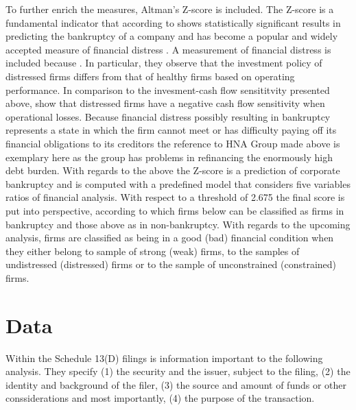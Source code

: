\documentclass[12pt]{article}
\begin{document}
To further enrich the measures, Altman's Z-score is included. The Z-score is a fundamental indicator that according to \citet[p.5]{Mohr2012} shows statistically significant results in predicting the bankruptcy of a company and has become a popular and widely accepted measure of financial distress \citep[p.2903]{Campbell2008}. A measurement of financial distress is included because . In particular, they observe that the investment policy of distressed firms differs from that of healthy firms based on operating performance. In comparison to the invesment-cash flow sensititvity presented above, \citet{Bhagat2005} show that distressed firms have a negative cash flow sensitivity when operational losses.
	 Because financial distress possibly resulting in bankruptcy represents a state in which the firm cannot meet or has difficulty paying off its financial obligations to its creditors the reference to HNA Group made above is exemplary here as the group has problems in refinancing the enormously high debt burden. 
 With regards to the above the Z-score is a prediction of corporate bankruptcy \citep[p.594]{Altman} and is computed with a predefined model that considers five variables ratios of financial analysis. With respect to a threshold of 2.675 \citep[p.607]{Altman1968} the final score is put into perspective, according to which firms below can be classified as firms in bankruptcy and those above as in non-bankruptcy. 
With regards to the upcoming analysis, firms are classified as being in a good (bad) financial condition when they either belong to sample of strong (weak) firms, to the samples of undistressed (distressed) firms or to the sample of unconstrained (constrained) firms.

\section{Data}

Within the Schedule 13(D) filings is information important to the following analysis. They specify (1) the security and the issuer, subject to the filing, (2) the identity and background of the filer, (3) the source and amount of funds or other conssiderations and most importantly, (4) the purpose of the transaction.
\end{document}
